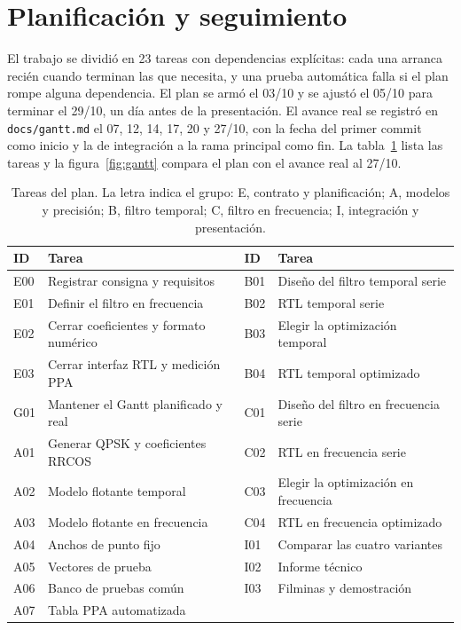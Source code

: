 \section{Planificación y seguimiento}\label{sec:gantt}

El trabajo se dividió en 23 tareas con dependencias explícitas: cada una arranca recién cuando terminan las que necesita, y una prueba automática falla si el plan rompe alguna dependencia. El plan se armó el 03/10 y se ajustó el 05/10 para terminar el 29/10, un día antes de la presentación. El avance real se registró en \texttt{docs/gantt.md} el 07, 12, 14, 17, 20 y 27/10, con la fecha del primer commit como inicio y la de integración a la rama principal como fin. La tabla~\ref{tab:tareas} lista las tareas y la figura~\ref{fig:gantt} compara el plan con el avance real al 27/10.

\begin{table}[h]
  \centering
  \small
  \caption{Tareas del plan. La letra indica el grupo: E, contrato y planificación; A, modelos y precisión; B, filtro temporal; C, filtro en frecuencia; I, integración y presentación.}\label{tab:tareas}
  \begin{tabular}{ll@{\hspace{2em}}ll}
    \toprule
    ID & Tarea & ID & Tarea \\
    \midrule
    E00 & Registrar consigna y requisitos & B01 & Diseño del filtro temporal serie \\
    E01 & Definir el filtro en frecuencia & B02 & RTL temporal serie \\
    E02 & Cerrar coeficientes y formato numérico & B03 & Elegir la optimización temporal \\
    E03 & Cerrar interfaz RTL y medición PPA & B04 & RTL temporal optimizado \\
    G01 & Mantener el Gantt planificado y real & C01 & Diseño del filtro en frecuencia serie \\
    A01 & Generar QPSK y coeficientes RRCOS & C02 & RTL en frecuencia serie \\
    A02 & Modelo flotante temporal & C03 & Elegir la optimización en frecuencia \\
    A03 & Modelo flotante en frecuencia & C04 & RTL en frecuencia optimizado \\
    A04 & Anchos de punto fijo & I01 & Comparar las cuatro variantes \\
    A05 & Vectores de prueba & I02 & Informe técnico \\
    A06 & Banco de pruebas común & I03 & Filminas y demostración \\
    A07 & Tabla PPA automatizada & & \\
    \bottomrule
  \end{tabular}
\end{table}


